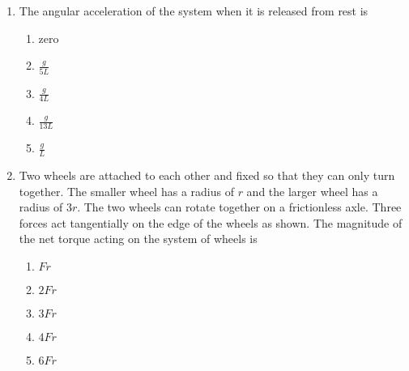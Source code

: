 \documentclass{../../../oss-classkick}
\begin{document}
\begin{multicols*}{2}
\begin{enumerate}[leftmargin=18pt]
  \item The angular acceleration of the system when it is released from rest is
    \begin{enumerate}[itemsep=4pt,topsep=0pt,leftmargin=18pt,label=(\Alph*)]
    \item zero
    \item $\displaystyle\frac{g}{5L}$
    \item $\displaystyle\frac{g}{4L}$
    \item $\displaystyle\frac{g}{13L}$
    \item $\displaystyle\frac{g}L$
    \end{enumerate}

  \item Two wheels are attached to each other and fixed so that they can only
    turn together. The smaller wheel has a radius of $r$ and the larger wheel
    has a radius of $3r$. The two wheels can rotate together on a frictionless
    axle. Three forces act tangentially on the edge of the wheels as shown.
    The magnitude of the net torque acting on the system of wheels is
    \begin{center}
    \end{center}
    \begin{enumerate}[nosep,leftmargin=18pt,label=(\Alph*)]
    \item$Fr$
    \item$2Fr$
    \item$3Fr$
    \item$4Fr$
    \item$6Fr$
    \end{enumerate}
    \columnbreak
    

\end{enumerate}
\end{multicols*}
\end{document}
